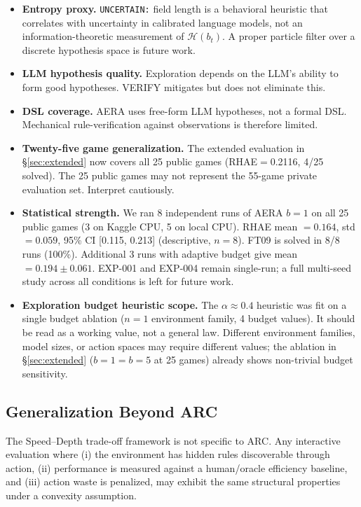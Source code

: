 \documentclass[11pt]{article}
\begin{document}
\begin{itemize}[leftmargin=*]
\item \textbf{Entropy proxy.} \texttt{UNCERTAIN:} field length is a behavioral heuristic that correlates with uncertainty in calibrated language models, not an information-theoretic measurement of $\mathcal{H}(b_t)$. A proper particle filter over a discrete hypothesis space is future work.
\item \textbf{LLM hypothesis quality.} Exploration depends on the LLM's ability to form good hypotheses. VERIFY mitigates but does not eliminate this.
\item \textbf{DSL coverage.} AERA uses free-form LLM hypotheses, not a formal DSL. Mechanical rule-verification against observations is therefore limited.
\item \textbf{Twenty-five game generalization.} The extended evaluation in \S\ref{sec:extended} now covers all 25 public games (RHAE$=$0.2116, 4/25 solved). The 25 public games may not represent the 55-game private evaluation set. Interpret cautiously.
\item \textbf{Statistical strength.} We ran 8 independent runs of AERA $b{=}1$ on all 25 public games (3 on Kaggle CPU, 5 on local CPU). RHAE mean $= 0.164$, std $= 0.059$, 95\% CI [0.115, 0.213] (descriptive, $n{=}8$). FT09 is solved in 8/8 runs (100\%). Additional 3 runs with adaptive budget give mean $= 0.194 \pm 0.061$. EXP-001 and EXP-004 remain single-run; a full multi-seed study across all conditions is left for future work.
\item \textbf{Exploration budget heuristic scope.} The $\alpha \approx 0.4$ heuristic was fit on a single budget ablation ($n{=}1$ environment family, 4 budget values). It should be read as a working value, not a general law. Different environment families, model sizes, or action spaces may require different values; the ablation in \S\ref{sec:extended} ($b{=}1{=}b{=}5$ at 25 games) already shows non-trivial budget sensitivity.
\end{itemize}

\subsection{Generalization Beyond ARC}

The Speed--Depth trade-off framework is not specific to ARC. Any interactive evaluation where (i) the environment has hidden rules discoverable through action, (ii) performance is measured against a human/oracle efficiency baseline, and (iii) action waste is penalized, may exhibit the same structural properties under a convexity assumption.
\end{document}
